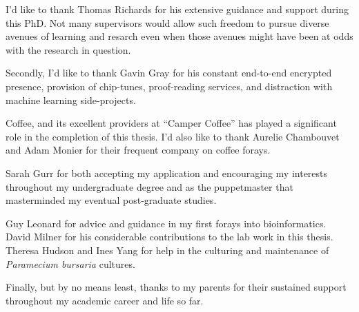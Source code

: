 
I'd like to thank Thomas Richards for his extensive guidance and support 
during this PhD. Not many supervisors
would allow such freedom to pursue diverse avenues of learning and
resarch even when those avenues might have been at odds with the research 
in question.

Secondly, I'd like to thank Gavin Gray 
for his constant end-to-end encrypted presence, provision of chip-tunes,
proof-reading services, and distraction with machine learning side-projects.  

Coffee, and its excellent providers at ``Camper Coffee''
has played a significant role in the completion of this thesis.
I'd also like to thank Aurelie Chambouvet and Adam Monier for their
frequent company on coffee forays. 

Sarah Gurr for both accepting my application and encouraging
my interests throughout my undergraduate degree and as the puppetmaster that 
masterminded my eventual post-graduate studies.

Guy Leonard for advice and guidance in my first forays into bioinformatics. 
David Milner for his considerable contributions to the lab work in this thesis.
Theresa Hudson and Ines Yang for help in the culturing and maintenance of 
\textit{Paramecium bursaria} cultures. 

Finally, but by no means least, thanks to my parents for their sustained
support throughout my academic career and life so far.  
